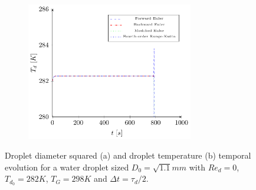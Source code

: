 \documentclass[../Interim_Report_Master]{subfiles}
\begin{document}
\begin{figure}\ContinuedFloat
	\centering
	\begin{subfigure}{\textwidth}
		\centering
		\includegraphics[width=0.8\textwidth]{./Diagrams/Coupled_Heat_Mass_Transfer_tau_2/Coupled_Heat_Transfer_tau_2.pdf}
		\caption{}
		\label{coupled_heat_tau_2}
	\end{subfigure}
	\caption{Droplet diameter squared (a) and droplet temperature (b) temporal evolution for a water droplet sized $D_0=\sqrt{1.1}mm$ with $Re_d=0$, $T_{d_0}=282K$, $T_G=298K$ and $\Delta t=\tau_d/2$.}
\end{figure}
\end{document}
